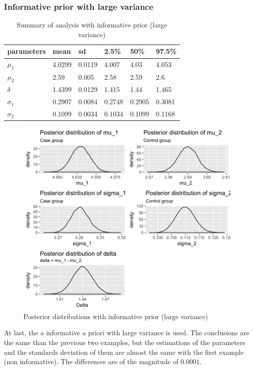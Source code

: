 \documentclass{article}
\begin{document}
\newpage
\subsubsection{Informative prior with large variance}

\begin{table}[ht!]
\centering
\caption{Summary of analysis with informative prior (large variance)}
\label{tbl:3}
\begin{tabular}{|l|lllll|}
\hline
parameters & mean   & sd     & 2.5\%  & 50\%   & 97.5\% \\ \hline
$\mu_1$    & 4.0299 & 0.0119 & 4.007  & 4.03   & 4.053  \\
$\mu_2$    & 2.59   & 0.005  & 2.58   & 2.59   & 2.6    \\
$\delta$   & 1.4399 & 0.0129 & 1.415  & 1.44   & 1.465  \\
$\sigma_1$ & 0.2907 & 0.0084 & 0.2748 & 0.2905 & 0.3081 \\
$\sigma_2$ & 0.1099 & 0.0034 & 0.1034 & 0.1099 & 0.1168 \\ \hline
\end{tabular}
\end{table}

\begin{figure}[ht!]
  \centering
  \includegraphics[width=.8\textwidth]{imgs/01_posterior_high.png}
  \caption{Posterior distributions with informative prior (large variance)}
  \label{fig:fig4}
\end{figure}

At last, the a informative a priori with large variance is used. The conclusions are the same than the previous two examples, but the estimations of the parameters and the standards deviation of them are almost the same with the first example (non informative). The differences are of the magnitude of $0.0001$.
\end{document}
